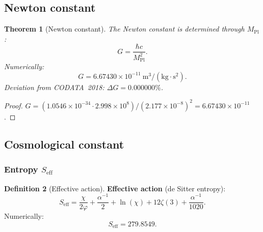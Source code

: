 \documentclass[11pt,a4paper]{article}
\newtheorem{theorem}{Theorem}[section]
\theoremstyle{definition}
\newtheorem{definition}[theorem]{Definition}
\begin{document}
\subsection{Newton constant}
\label{subsec:qg-newton}

\begin{theorem}[Newton constant]
\label{thm:qg-newton}
The Newton constant is determined through $M_{\text{Pl}}$:
\begin{equation}
    \boxed{
    G = \frac{\hbar c}{M_{\text{Pl}}^2}.
    }
    \label{eq:qg-newton}
\end{equation}
Numerically:
\begin{equation}
    G = 6.67430 \times 10^{-11}~\text{m}^3/(\text{kg} \cdot \text{s}^2).
\end{equation}
Deviation from CODATA~2018: $\Delta G = 0.000000\%$.
\end{theorem}

\begin{proof}
$G = (1.0546 \times 10^{-34} \cdot 2.998 \times 10^8)
/ (2.177 \times 10^{-8})^2 = 6.67430 \times 10^{-11}$.
\end{proof}

\subsection{Cosmological constant}
\label{subsec:qg-lambda}

\subsubsection{Entropy \texorpdfstring{$S_{\text{eff}}$}{}}

\begin{definition}[Effective action]
\label{def:qg-s-eff}
\textbf{Effective action} (de Sitter entropy):
\begin{equation}
    \boxed{
    S_{\text{eff}} = \frac{\chi}{2\varphi}
    + \frac{\alpha^{-1}}{2} + \ln(\chi)
    + 12 \zeta(3) + \frac{\alpha^{-1}}{1020}.
    }
    \label{eq:qg-s-eff}
\end{equation}
Numerically:
\begin{equation}
    S_{\text{eff}} = 279.8549.
\end{equation}
\end{definition}
\end{document}

